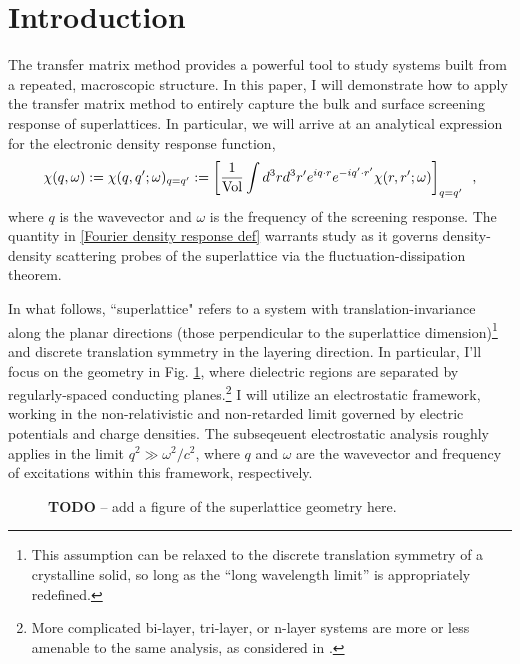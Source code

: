 \section*{Introduction}

The transfer matrix method provides a powerful tool to study systems built from a repeated, macroscopic structure.  In this paper, I will demonstrate how to apply the transfer matrix method to entirely capture the bulk and surface screening response of superlattices.  In particular, we will arrive at an analytical expression for the electronic density response function,
\begin{equation}
    \label{Fourier density response def}
    \chi(q,\omega):=\chi(q,q';\omega)_{q=q'}
    :=
    \left[\frac{1}{\text{Vol}}\int d^3 r d^3 r' e^{iq\cdot r} e^{-i q'\cdot r'}\chi(r,r';\omega)\right]_{q=q'}
    \,\,\,,
\end{equation}
where $q$ is the wavevector and $\omega$ is the frequency of the screening response.  The quantity in \eqref{Fourier density response def} warrants study as it governs density-density scattering probes of the superlattice via the fluctuation-dissipation theorem.

In what follows, ``superlattice" refers to a system with translation-invariance along the planar directions (those perpendicular to the superlattice dimension)\footnote{This assumption can be relaxed to the discrete translation symmetry of a crystalline solid, so long as the ``long wavelength limit'' is appropriately redefined.} and discrete translation symmetry in the layering direction.  In particular, I'll focus on the geometry in Fig. \ref{figure: superlattice geometry}, where dielectric regions are separated by regularly-spaced conducting planes.\footnote{More complicated bi-layer, tri-layer, or n-layer systems are more or less amenable to the same analysis, as considered in \cite{Cottam1993, Cottam2004}.}  I will utilize an electrostatic framework, working in the non-relativistic and non-retarded limit governed by electric potentials and charge densities.  The subseqeuent electrostatic analysis roughly applies in the limit $q^2\gg \omega^2/c^2$, where $q$ and $\omega$ are the wavevector and frequency of excitations within this framework, respectively.

\begin{figure}
    \centering
    \caption{
    {\bf TODO} -- add a figure of the superlattice geometry here.
    }
    \label{figure: superlattice geometry}
\end{figure}

